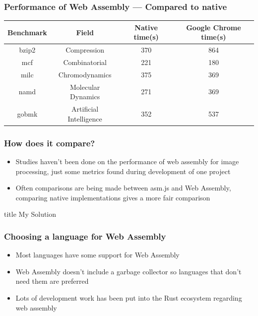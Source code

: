\documentclass{beamer}
\begin{document}
\begin{frame}
    \frametitle{Performance of Web Assembly — Compared to native}

    {\small
        \begin{table}[H]
            \centering
            \vspace*{6pt}
            \label{native}
            \begin{tabular}{cccc}\hline\hline
                Benchmark & Field                   & Native time(s) & Google Chrome time(s) \\ \hline
                bzip2     & Compression             & 370            & 864                   \\
                mcf       & Combinatorial           & 221            & 180                   \\
                milc      & Chromodynamics          & 375            & 369                   \\
                namd      & Molecular Dynamics      & 271            & 369                   \\
                gobmk     & Artificial Intelligence & 352            & 537
            \end{tabular}
        \end{table}
    }
\end{frame}

\begin{frame}
    \frametitle{How does it compare?}
    \begin{itemize}
        \item Studies haven't been done on the performance of web assembly for image processing, just some metrics found during development of one project
        \item Often comparisons are being made between asm.js and Web Assembly, comparing native implementations gives a more fair comparison
    \end{itemize}
\end{frame}

\begin{frame}
    \vfill
    \centering
    \begin{beamercolorbox}[sep=8pt,center,shadow=true,rounded=true]{title}
         My Solution\par%
    \end{beamercolorbox}
    \vfill
\end{frame}

\begin{frame}
    \frametitle{Choosing a language for Web Assembly}
    \begin{itemize}
        \item Most languages have some support for Web Assembly
        \item Web Assembly doesn't include a garbage collector so languages that don't need them are preferred
        \item Lots of development work has been put into the Rust ecosystem regarding web assembly
    \end{itemize}


\end{frame}
\end{document}
